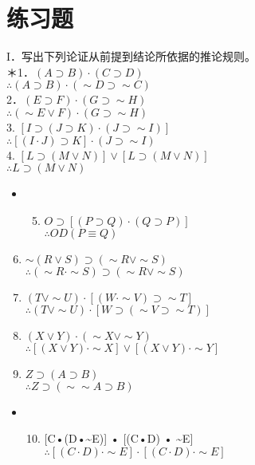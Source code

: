 \section*{练习题}
I．写出下列论证从前提到结论所依据的推论规则。\\
＊1．$(A \supset B) \cdot(C \supset D)$\\
$\therefore(A \supset B) \cdot(\sim D \supset \sim C)$\\
2．$(E \supset F) \cdot(G \supset \sim H)$\\
$\therefore(\sim E \vee F) \cdot(G \supset \sim H)$\\
3. $[I \supset(J \supset K) \cdot(J \supset \sim I)]$\\
$\therefore[(I \cdot J) \supset K] \cdot(J \supset \sim I)$\\
4. $[L \supset(M \vee N)] \vee[L \supset(M \vee N)]$\\
$\therefore L \supset(M \vee N)$

\begin{itemize}
  \item 
  \begin{enumerate}
    \setcounter{enumii}{4}
    \item $O \supset[(P \supset Q) \cdot(Q \supset P)]$\\
$\therefore O D(P \equiv Q)$
  \end{enumerate}
\end{itemize}

\begin{enumerate}
  \setcounter{enumi}{5}
  \item $\sim(R \vee S) \supset(\sim R \vee \sim S)$\\
$\therefore(\sim R \cdot \sim S) \supset(\sim R \vee \sim S)$
  \item $(T \vee \sim U) \cdot[(W \cdot \sim V) \supset \sim T]$\\
$\therefore(T \vee \sim U) \cdot[W \supset(\sim V \supset \sim T)]$
  \item $(X \vee Y) \cdot(\sim X \vee \sim Y)$\\
$\therefore[(X \vee Y) \cdot \sim X] \vee[(X \vee Y) \cdot \sim Y]$
  \item $Z \supset(A \supset B)$\\
$\therefore Z \supset(\sim \sim A \supset B)$
\end{enumerate}

\begin{itemize}
  \item 
  \begin{enumerate}
    \setcounter{enumii}{9}
    \item \hspace{0pt} [C•(D•\~{}E)] • [(C•D) • \~{}E]\\
$\therefore[(C \cdot D) \cdot \sim E] \cdot[(C \cdot D) \cdot \sim E]$
  \end{enumerate}
\end{itemize}

